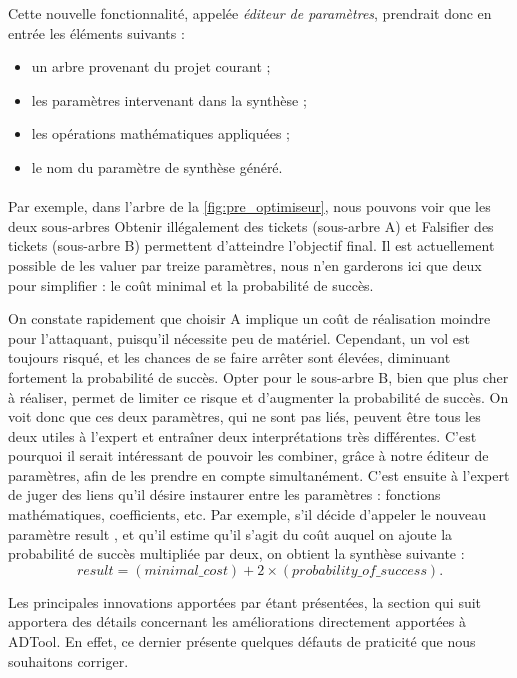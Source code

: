			Cette nouvelle fonctionnalité, appelée \emph{éditeur de paramètres}, prendrait donc en entrée les éléments suivants :
			\begin{itemize}
				\item un arbre provenant du projet courant ;
				\item les paramètres intervenant dans la synthèse ;
				\item les opérations mathématiques appliquées ;
				\item le nom du paramètre de synthèse généré.
			\end{itemize}

			\paragraph{}
			Par exemple, dans l'arbre de la {} \ref{fig:pre_optimiseur}, nous pouvons voir que les deux sous-arbres \og Obtenir illégalement des tickets \fg{} (sous-arbre A) et \og Falsifier des tickets \fg{} (sous-arbre B) permettent d'atteindre l'objectif final. Il est actuellement possible de les valuer par treize paramètres, nous n'en garderons ici que deux pour simplifier : le coût minimal et la probabilité de succès.

			On constate rapidement que choisir A implique un coût de réalisation moindre pour l'attaquant, puisqu'il nécessite peu de matériel. Cependant, un vol est toujours risqué, et les chances de se faire arrêter sont élevées, diminuant fortement la probabilité de succès. Opter pour le sous-arbre B, bien que plus cher à réaliser, permet de limiter ce risque et d'augmenter la probabilité de succès. On voit donc que ces deux paramètres, qui ne sont pas liés, peuvent être tous les deux utiles à l'expert et entraîner deux interprétations très différentes. C'est pourquoi il serait intéressant de pouvoir les combiner, grâce à notre éditeur de paramètres, afin de les prendre en compte simultanément. C'est ensuite à l'expert de juger des liens qu'il désire instaurer entre les paramètres : fonctions mathématiques, coefficients, etc. Par exemple, s'il décide d'appeler le nouveau paramètre \og result \fg{}, et qu'il estime qu'il s'agit du coût auquel on ajoute la probabilité de succès multipliée par deux, on obtient la synthèse suivante : \[ result = (minimal\_cost) + 2 \times (probability\_of\_success).\]

			Les principales innovations apportées par \glasir étant présentées, la section qui suit apportera des détails concernant les améliorations directement apportées à ADTool. En effet, ce dernier présente quelques défauts de praticité que nous souhaitons corriger.